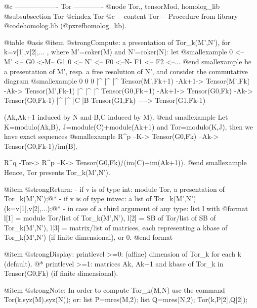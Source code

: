 @c ------------------- Tor -------------
@node Tor,, tensorMod, homolog_lib
@subsubsection Tor
@cindex Tor
@c ---content Tor---
Procedure from library @code{homolog.lib} (@pxref{homolog_lib}).

@table @asis
@item @strong{Compute:}
a presentation of Tor_k(M',N'), for k=v[1],v[2],... , where
M'=coker(M) and N'=coker(N): let
@smallexample
       0 <-- M' <-- G0 <-M-- G1                
       0 <-- N' <-- F0 <--N- F1 <-- F2 <--...  
@end smallexample
be a presentation of M', resp. a free resolution of N', and consider
the commutative diagram
@smallexample
          0                    0                    0
          |^                   |^                   |^
  Tensor(M',Fk+1) -Ak+1-> Tensor(M',Fk) -Ak-> Tensor(M',Fk-1)
          |^                   |^                   |^
  Tensor(G0,Fk+1) -Ak+1-> Tensor(G0,Fk) -Ak-> Tensor(G0,Fk-1)
                               |^                   |^
                               |C                   |B
                          Tensor(G1,Fk) ----> Tensor(G1,Fk-1)

       (Ak,Ak+1 induced by N and B,C induced by M).
@end smallexample
Let K=modulo(Ak,B), J=module(C)+module(Ak+1) and Tor=modulo(K,J),
then we have exact sequences
@smallexample
    R^p  --K-> Tensor(G0,Fk) --Ak-> Tensor(G0,Fk-1)/im(B),

    R^q -Tor-> R^p --K-> Tensor(G0,Fk)/(im(C)+im(Ak+1)). 
@end smallexample
Hence, Tor presents Tor_k(M',N').

@item @strong{Return:}
- if v is of type int: module Tor, a presentation of Tor_k(M',N');@*
- if v is of type intvec: a list of Tor_k(M',N') (k=v[1],v[2],...);@*
- in case of a third argument of any type: list l with
@format
     l[1] = module Tor/list of Tor_k(M',N'),
     l[2] = SB of Tor/list of SB of Tor_k(M',N'),
     l[3] = matrix/list of matrices, each representing a kbase of Tor_k(M',N')
                (if finite dimensional), or 0.
@end format

@item @strong{Display:}
printlevel >=0: (affine) dimension of Tor_k for each k (default).
@* printlevel >=1: matrices Ak, Ak+1 and kbase of Tor_k in Tensor(G0,Fk)
(if finite dimensional).

@item @strong{Note:}
In order to compute Tor_k(M,N) use the command Tor(k,syz(M),syz(N));
or: list P=mres(M,2); list Q=mres(N,2); Tor(k,P[2],Q[2]);

